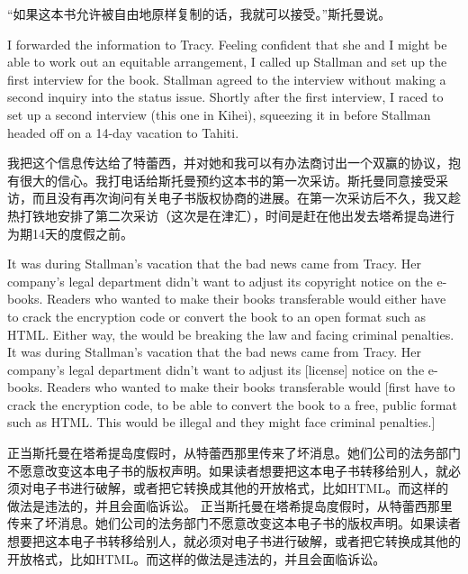 \ifdefined\chs
``如果这本书允许被自由地原样复制的话，我就可以接受。''斯托曼说。
\ifdefined{}
\fi
\fi

\ifdefined\eng
I forwarded the information to Tracy. Feeling confident that she and I might be able to work out an equitable arrangement, I called up Stallman and set up the first interview for the book. Stallman agreed to the interview without making a second inquiry into the status issue. Shortly after the first interview, I raced to set up a second interview (this one in Kihei), squeezing it in before Stallman headed off on a 14-day vacation to Tahiti. 
\ifdefined{}
\fi
\fi

\ifdefined\chs
我把这个信息传达给了特蕾西，并对她和我可以有办法商讨出一个双赢的协议，抱有很大的信心。我打电话给斯托曼预约这本书的第一次采访。斯托曼同意接受采访，而且没有再次询问有关电子书版权协商的进展。在第一次采访后不久，我又趁热打铁地安排了第二次采访（这次是在津汇），时间是赶在他出发去塔希提岛进行为期14天的度假之前。
\ifdefined{}
\fi
\fi

\ifdefined\eng
\ifdefined\vone
It was during Stallman's vacation that the bad news came from Tracy. Her company's legal department didn't want to adjust its copyright notice on the e-books. Readers who wanted to make their books transferable would either have to crack the encryption code or convert the book to an open format such as HTML. Either way, the would be breaking the law and facing criminal penalties.
\fi
\ifdefined\vtwo
It was during Stallman's vacation that the bad news came from Tracy. Her company's legal department didn't want to adjust its [license] notice on the e-books. Readers who wanted to make their books transferable would [first have to crack the encryption code, to be able to convert the book to a free, public format such as HTML. This would be illegal and they might face criminal penalties.]
\fi
\fi

\ifdefined\chs
\ifdefined\vone
正当斯托曼在塔希提岛度假时，从特蕾西那里传来了坏消息。她们公司的法务部门不愿意改变这本电子书的版权声明。如果读者想要把这本电子书转移给别人，就必须对电子书进行破解，或者把它转换成其他的开放格式，比如HTML。而这样的做法是违法的，并且会面临诉讼。
\fi
\ifdefined\vtwo
正当斯托曼在塔希提岛度假时，从特蕾西那里传来了坏消息。她们公司的法务部门不愿意改变这本电子书的版权声明。如果读者想要把这本电子书转移给别人，就必须对电子书进行破解，或者把它转换成其他的开放格式，比如HTML。而这样的做法是违法的，并且会面临诉讼。
\fi
\fi

